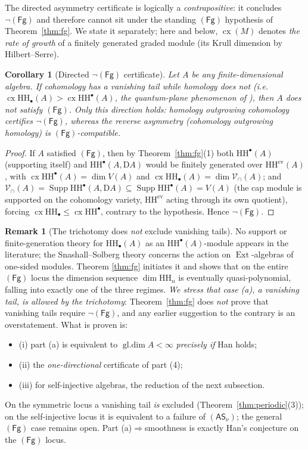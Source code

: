 \documentclass[11pt]{amsart}
\newtheorem{corollary}[theorem]{Corollary}
\theoremstyle{definition}
\newtheorem{remark}[theorem]{Remark}
\newcommand{\HH}{\mathrm{HH}}
\newcommand{\D}{\mathrm{D}}
\newcommand{\Ext}{\operatorname{Ext}}
\newcommand{\gl}{\operatorname{gl.dim}}
\newcommand{\Supp}{\operatorname{Supp}}
\newcommand{\Vcap}{\mathcal{V}_{\cap}}
\newcommand{\Fg}{\mathsf{(Fg)}}
\newcommand{\cx}{\operatorname{cx}}
\newcommand{\ev}{\mathrm{ev}}
\newcommand{\ASnu}{\mathsf{(AS_\nu)}}
\begin{document}
The directed asymmetry certificate is logically a \emph{contrapositive}: it
concludes $\neg\Fg$ and therefore cannot sit under the standing $\Fg$
hypothesis of Theorem~\ref{thm:fg}. We state it separately; here and below,
$\cx(M)$ denotes \textit{the rate of growth} of a finitely generated graded module
(its Krull dimension by Hilbert--Serre).

\begin{corollary}[Directed $\neg\Fg$ certificate]\label{cor:asymcert}
Let $A$ be any finite-dimensional algebra. If cohomology has a vanishing tail
while homology does not (i.e.\ $\cx\HH_\bullet(A)>\cx\HH^\bullet(A)$, the
quantum-plane phenomenon of \cite{BerghErdmann,BGMS}), then $A$ does not
satisfy $\Fg$. Only this direction holds: homology outgrowing cohomology
certifies $\neg\Fg$, whereas the reverse asymmetry (cohomology outgrowing
homology) is $\Fg$-compatible.
\end{corollary}

\begin{proof}
If $A$ satisfied $\Fg$, then by Theorem~\ref{thm:fg}(1) both $\HH^\bullet(A)$
(supporting itself) and $\HH^\bullet(A,\D A)$ would be finitely generated over
$\HH^{\ev}(A)$, with $\cx\HH^\bullet(A)=\dim V(A)$ and
$\cx\HH_\bullet(A)=\dim\Vcap(A)$; and $\Vcap(A)=\Supp\HH^\bullet(A,\D A)
\subseteq\Supp\HH^\bullet(A)=V(A)$ (the cap module is supported on the
cohomology variety, $\HH^{\ev}$ acting through its own quotient), forcing
$\cx\HH_\bullet\le\cx\HH^\bullet$, contrary to the hypothesis. Hence $\neg\Fg$.
\end{proof}

\begin{remark}[The trichotomy does \emph{not} exclude vanishing tails]
\label{rem:notexcluded}
No support or finite-generation theory for $\HH_\bullet(A)$ as an
$\HH^\bullet(A)$-module appears in the literature; the Snashall--Solberg
theory concerns the action on $\Ext$-algebras of one-sided modules. Theorem
\ref{thm:fg} initiates it and shows that on the entire $\Fg$ locus the
dimension sequence $\dim\HH_n$ is eventually quasi-polynomial, falling into
exactly one of the three regimes. \emph{We stress that case (a), a vanishing
tail, is allowed by the trichotomy}: Theorem~\ref{thm:fg} does \emph{not}
prove that vanishing tails require $\neg\Fg$, and any earlier suggestion to the
contrary is an overstatement. What is proven is:
\begin{itemize}
    \item (i) part (a) is equivalent to $\gl A<\infty$ \emph{precisely if} Han holds;
    \item (ii) the \emph{one-directional} certificate of part (4);
    \item (iii) for self-injective algebras, the reduction of the next subsection.
\end{itemize}
On the symmetric locus a vanishing tail \emph{is}
excluded (Theorem~\ref{thm:periodic}(3)); on the self-injective locus it is equivalent to a
failure of $\ASnu$; the general $\Fg$ case remains open. Part
(a)$\Rightarrow$smoothness is exactly Han's conjecture on the $\Fg$ locus.
\end{remark}
\end{document}
